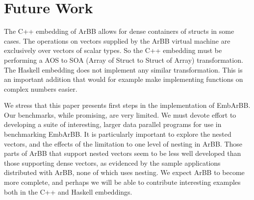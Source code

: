 

\section{Future Work} 
\label{sec:FutureWork}







The C++ embedding of ArBB allows for dense containers of structs in some cases. 
The operations on vectors supplied by the ArBB virtual machine are exclusively 
over vectors of scalar types. So the C++ embedding must be performing a AOS to SOA 
(Array of Struct to Struct of Array) transformation. The Haskell embedding 
does not implement any similar transformation. This is an important addition 
that would for example make implementing functions on complex numbers easier. 

We stress that this paper presents first steps in the implementation of 
EmbArBB. Our benchmarks, while promising, are very limited. We must devote 
effort to developing a suite of interesting, larger data parallel programs 
for use in benchmarking EmbArBB. It is particularly important to explore the 
nested vectors, and the effects of the limitation to one level of nesting 
in ArBB. Those parts of ArBB that support nested vectors seem to be less well 
developed than those supporting dense vectors, as evidenced by the sample 
applications distributed with ArBB, none of which uses nesting. We expect 
ArBB to become more complete, and perhaps we will be able to contribute 
interesting examples both in the C++ and Haskell embeddings.

